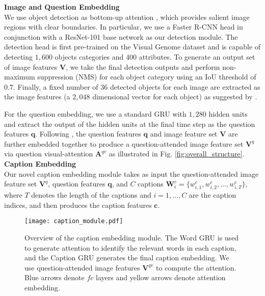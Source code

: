 \documentclass[11pt,a4paper]{article}
\begin{document}
\noindent\textbf{Image and Question Embedding}\\
We use object detection as bottom-up attention \cite{anderson2017bottom}, which provides salient image regions with clear boundaries. In particular, we use a Faster R-CNN head \cite{girshick2015fast} in conjunction with a ResNet-101 base network \cite{he2016deep} as our detection module. The detection head is first pre-trained on the Visual Genome dataset \cite{krishna2017visual} and is capable of detecting $1,600$ objects categories and $400$ attributes. To generate an output set of image features $\textbf{V}$, we take the final detection outputs and perform non-maximum suppression (NMS) for each object category using an IoU threshold of $0.7$. Finally, a fixed number of 36 detected objects for each image are extracted as the image features (a $2,048$ dimensional vector for each object) as suggested by .

For the question embedding, we use a standard GRU \cite{cho2014learning} with $1,280$ hidden units and extract the output of the hidden units at the final time step as the question features $\textbf{q}$.
Following , the question features $\textbf{q}$ and image feature set $\textbf{V}$ are further embedded together to produce a question-attended image feature set $\textbf{V}^q$ via  question visual-attention $\textbf{A}^{qv}$ as illustrated in Fig. \ref{fig:overall_structure}.\\ 

\noindent\textbf{Caption Embedding}\\
Our novel caption embedding module takes as input the question-attended image feature set $\textbf{V}^q$, question features $\textbf{q}$, and  $C$ captions $\textbf{W}^c_i = \{w^c_{i, 1}, w^c_{i, 2}, ..., w^c_{i,T}\}$, where $T$ denotes the length of the captions and $i=1,...,C$ are the caption indices, and then produces the caption features $\textbf{c}$. 

\begin{figure}[h]
\centering
\texttt{[image: caption\_module.pdf]}
\caption{Overview of the caption embedding module. The Word GRU is used to generate attention to identify the relevant words in each caption, and the Caption GRU generates the final caption embedding. We use question-attended image features $\textbf{V}^{qv}$ to compute the attention. Blue arrows denote $fc$ layers and yellow arrows denote attention embedding.}
\label{fig:caption_module}
\end{figure}
\end{document}
